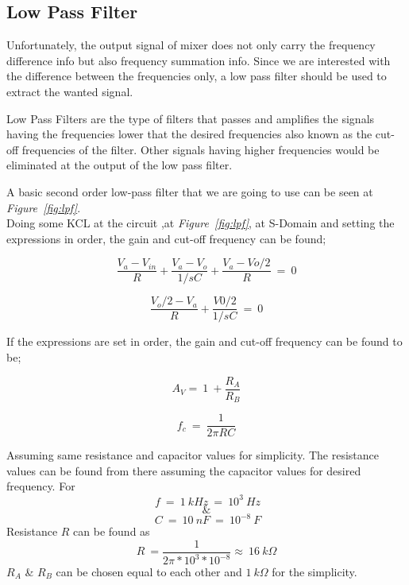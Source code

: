\documentclass[paper]{IEEEtran}
\begin{document}

		
				
\subsection{Low Pass Filter}


	Unfortunately, the output signal of mixer does not only carry the frequency difference info but also frequency summation info. Since we are interested with the difference between the frequencies only, a low pass filter should be used to extract the wanted signal.

	Low Pass Filters are the type of filters that passes and amplifies the signals having the frequencies lower that the desired frequencies also known as the cut-off frequencies of the filter. Other signals having higher frequencies would be eliminated at the output of the low pass filter. 	

	A basic second order low-pass filter that we are going to use can be seen at \textit{Figure~\ref{fig:lpf}}. 	\\
	 

	
	Doing some KCL at the circuit ,at \textit{Figure~\ref{fig:lpf}}, at S-Domain and setting the expressions in order, the gain and cut-off frequency can be found;
	
	
	$$ \frac{V_a - V_{in}}{R}+\frac{V_a-V_o}{1/sC}+\frac{V_a-Vo/2}{R} ~=~0$$
	
	$$ \frac{V_o/2-V_a}{R}+\frac{V0/2}{1/sC} ~=~0	 $$
	
	If the expressions are set in order, the gain and cut-off frequency can be found to be;
	
	$$ A_V = ~1~+ \frac{R_A}{R_B} $$

	$$	f_c ~=~ \frac{1}{2\pi RC}	$$
	
	Assuming same resistance and capacitor values for simplicity. The resistance values can be found from there assuming the capacitor values for desired frequency. For 
	$$~f~=~1~kHz~=~10^3~Hz $$ 
	$$ \& $$ 
	$$~C~=~10~nF~=~10^{-8}~F$$
	Resistance $R$ can be found as
	$$ R~=\frac{1}{2\pi*10^3*10^{-8}}\approx~16~k\Omega $$
	$R_A$ \& $R_B$ can be chosen equal to each other and $1~k\Omega$ for the simplicity.
\end{document}
